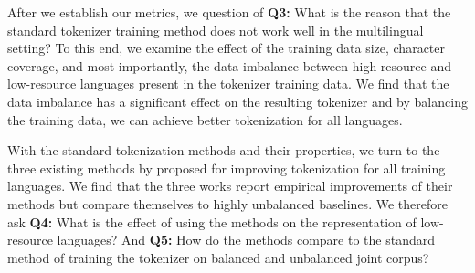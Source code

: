 After we establish our metrics, we  question of \textbf{Q3:} What is the reason that the standard tokenizer training method does not work well in the multilingual setting? To this end, we examine the effect of the training data size, character coverage, and most importantly, the data imbalance between high-resource and low-resource languages present in the tokenizer training data. We find that the data imbalance has a significant effect on the resulting tokenizer and by balancing the training data, we can achieve better tokenization for all languages.


%  

With  the standard tokenization methods and their properties, we turn to the three existing methods by \citet{chung_improving_2020,zheng_allocating_2021,liang_xlm-v_2023} proposed for improving tokenization for all training languages. We find that the three works report empirical improvements of their methods but compare themselves to highly unbalanced baselines. We therefore ask \textbf{Q4:} What is the effect of using the  methods on the representation of low-resource languages? And
\textbf{Q5:} How do the  methods compare to the standard method of training the tokenizer on balanced and unbalanced joint corpus?

